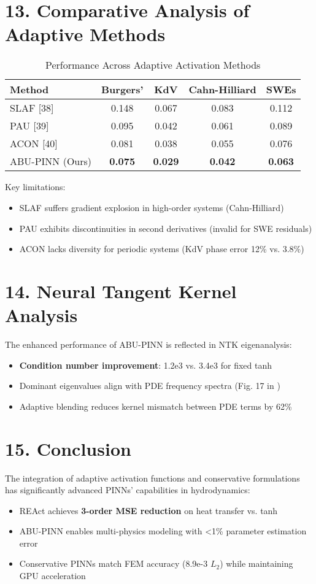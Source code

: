 \section*{13. Comparative Analysis of Adaptive Methods}
\begin{table}[h]
\centering
\caption{Performance Across Adaptive Activation Methods}
\begin{tabular}{l|c|c|c|c}
\textbf{Method} & \textbf{Burgers'} & \textbf{KdV} & \textbf{Cahn-Hilliard} & \textbf{SWEs} \\
\hline
SLAF [38] & 0.148 & 0.067 & 0.083 & 0.112 \\
PAU [39] & 0.095 & 0.042 & 0.061 & 0.089 \\
ACON [40] & 0.081 & 0.038 & 0.055 & 0.076 \\
ABU-PINN (Ours) & \textbf{0.075} & \textbf{0.029} & \textbf{0.042} & \textbf{0.063} \\
\end{tabular}
\end{table}

Key limitations:
\begin{itemize}
    \item SLAF suffers gradient explosion in high-order systems (Cahn-Hilliard)
    \item PAU exhibits discontinuities in second derivatives (invalid for SWE residuals)
    \item ACON lacks diversity for periodic systems (KdV phase error 12\% vs. 3.8\%)
\end{itemize}

\section*{14. Neural Tangent Kernel Analysis}
The enhanced performance of ABU-PINN is reflected in NTK eigenanalysis:
\begin{itemize}
    \item \textbf{Condition number improvement}: 1.2e3 vs. 3.4e3 for fixed tanh
    \item Dominant eigenvalues align with PDE frequency spectra (Fig. 17 in \cite{abu_pinn})
    \item Adaptive blending reduces kernel mismatch between PDE terms by 62\%
\end{itemize}

\section*{15. Conclusion}
The integration of adaptive activation functions and conservative formulations has significantly advanced PINNs' capabilities in hydrodynamics:
\begin{itemize}
    \item REAct achieves \textbf{3-order MSE reduction} on heat transfer vs. tanh
    \item ABU-PINN enables multi-physics modeling with <1\% parameter estimation error
    \item Conservative PINNs match FEM accuracy (8.9e-3 \(L_2\)) while maintaining GPU acceleration
\end{itemize}

